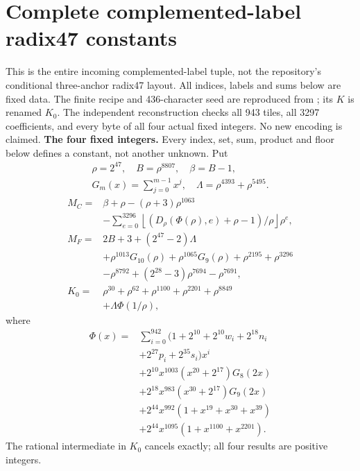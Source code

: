\section{Complete complemented-label radix47 constants}
\label{sec:inverse47constants}
This is the entire incoming complemented-label tuple, not the repository's
conditional three-anchor radix47 layout. All indices, labels and sums below
are fixed data. The finite recipe and 436-character seed are reproduced from
; its $K$ is renamed $K_0$.
The independent reconstruction checks all 943 tiles, all 3297 coefficients,
and every byte of all four actual fixed integers. No new encoding is claimed.
\begingroup
\providecommand{\fl}[1]{\left\lfloor#1\right\rfloor}
\providecommand{\rg}[2]{\{#1,\ldots,#2\}}
\textbf{The four fixed integers.}
Every index, set, sum, product and floor below defines a constant, not
another unknown. Put
\[
\begin{gathered}
\rho=2^{47},\quad B=\rho^{8807},\quad\beta=B-1,\\
G_m(x)=\sum_{j=0}^{m-1}x^j,\quad
\Lambda=\rho^{4393}+\rho^{5495}.
\end{gathered}
\]
\begin{align*}
M_C={}&\beta+\rho-(\rho+3)\rho^{1063}\\
&-\sum_{e=0}^{3296}\fl{(D_\rho(\Phi(\rho),e)+\rho-1)/\rho}\rho^e,\\
M_F={}&2B+3+(2^{47}-2)\Lambda\\
&+\rho^{1013}G_{10}(\rho)+\rho^{1065}G_9(\rho)
  +\rho^{2195}+\rho^{3296}\\
&-\rho^{8792}+(2^{28}-3)\rho^{7694}-\rho^{7691},\\
K_0={}&\rho^{30}+\rho^{62}+\rho^{1100}+\rho^{2201}+\rho^{8849}\\
&+\Lambda\Phi(1/\rho),
\end{align*}
where
\[
\begin{split}
\Phi(x)={}&\sum_{i=0}^{942}(1+2^{10}+2^{10}w_i+2^{18}n_i\\
&+2^{27}p_i+2^{35}s_i)x^i\\
&+2^{10}x^{1003}(x^{20}+2^{17})G_8(2x)\\
&+2^{18}x^{983}(x^{30}+2^{17})G_9(2x)\\
&+2^{44}x^{992}(1+x^{19}+x^{30}+x^{39})\\
&+2^{44}x^{1095}(1+x^{1100}+x^{2201}).
\end{split}
\]
The rational intermediate in $K_0$ cancels exactly; all four results are positive integers.

